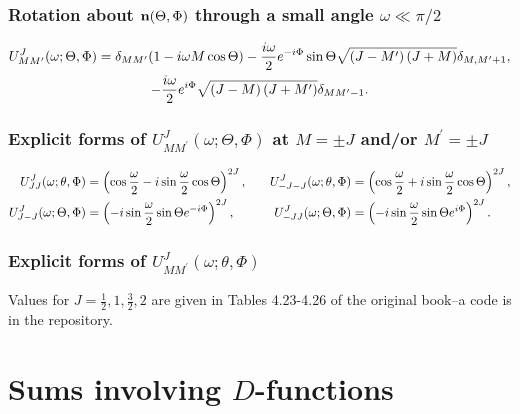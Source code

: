 \subsubsection{ Rotation about $\mathbf{n}(\Theta, \Phi)$ through a small angle $\omega \ll \pi / 2$}
\begin{gather}
U_{M M^{\prime}}^{J}(\omega ; \Theta, \Phi)=\delta_{M M^{\prime}}(1-i \omega M \cos \Theta)-\frac{i \omega}{2} e^{-i \Phi} \sin \Theta \sqrt{\left(J-M^{\prime}\right)(J+M)} \delta_{M, M^{\prime}+1}  ,\notag\\
-\frac{i \omega}{2} e^{i \Phi} \sqrt{(J-M)\left(J+M^{\prime}\right)} \delta_{M M^{\prime}-1}. \label{eq:4:5:31}
\end{gather}
\subsubsection{ Explicit forms of $U_{M M^{\prime}}^{J}(\omega ; \Theta, \Phi)$ at $M= \pm J$ and/or $M^{\prime}= \pm J$}
\begin{alignat}{4}
U_{J J}^{J}(\omega ; \theta, \Phi)&=\left(\cos \frac{\omega}{2}-i \sin \frac{\omega}{2} \cos \Theta\right)^{2 J}, \quad&U_{-J-J}^{J}(\omega ; \theta, \Phi)&=\left(\cos \frac{\omega}{2}+i \sin \frac{\omega}{2} \cos \Theta\right)^{2 J}  ,\notag\\
U_{J-J}^{J}(\omega ; \Theta, \Phi)&=\left(-i \sin \frac{\omega}{2} \sin \Theta e^{-i \Phi}\right)^{2 J}, &U_{-J J}^{J}(\omega ; \Theta, \Phi)&=\left(-i \sin \frac{\omega}{2} \sin \Theta e^{i \Phi}\right)^{2 J}. \label{eq:4:5:32}
\end{alignat}
\subsubsection{ Explicit forms of $U_{M M^{\prime}}^{J}(\omega ; \theta, \Phi)$}
Values for $J=\frac{1}{2}, 1, \frac{3}{2}, 2$ are given in Tables 4.23-4.26 of the original book--a code is in the repository.

\section{Sums involving $D$-functions}\label{sec:4.6}
